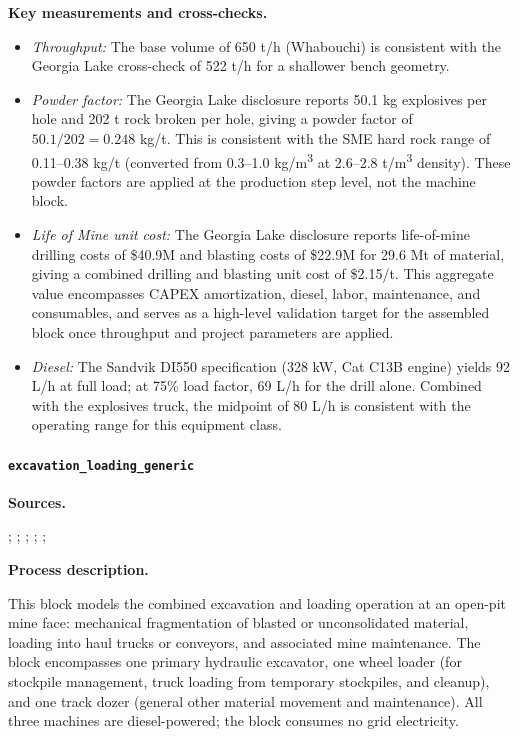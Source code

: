 \medskip
\noindent\textbf{Key measurements and cross-checks.}\quad

\begin{itemize}[noitemsep]
	\item \textit{Throughput:} The base volume of 650 t/h (Whabouchi) is consistent with the Georgia Lake cross-check of 522 t/h for a shallower bench geometry.
	\item \textit{Powder factor:} The Georgia Lake disclosure reports 50.1 kg explosives per hole and 202 t rock broken per hole, giving a powder factor of $50.1/202 = 0.248$ kg/t. This is consistent with the SME hard rock range of 0.11--0.38 kg/t (converted from 0.3--1.0 \si{kg/m^3} at 2.6--2.8 \si{t/m^3} density). These powder factors are applied at the production step level, not the machine block.
	\item \textit{Life of Mine unit cost:} The Georgia Lake disclosure reports life-of-mine drilling costs of \$40.9M and blasting costs of \$22.9M for 29.6 Mt of material, giving a combined drilling and blasting unit cost of \$2.15/t. This aggregate value encompasses CAPEX amortization, diesel, labor, maintenance, and consumables, and serves as a high-level validation target for the assembled block once throughput and project parameters are applied.
	\item \textit{Diesel:} The Sandvik DI550 specification (328 kW, Cat C13B engine) yields 92 L/h at full load; at 75\% load factor, 69 L/h for the drill alone. Combined with the explosives truck, the midpoint of 80 L/h is consistent with the operating range for this equipment class.
\end{itemize}

\clearpage
\paragraph{\texttt{excavation\_loading\_generic}}\label{app:04-methods-blockdefs-excavload}

\medskip
\noindent\textbf{Sources.}\quad

\citet{CatPerformanceHandbookfromVSTfuelconsumption20221209T212009}; \citet{warrenGeorgiaLakeLithium2022}; \citet{mccrackenNI43101Technical2023}; \citet{miningplusptyltd.SECTechnicalReport2023plus}; \citet{petersPlantDesignEconomics1991}; \citet{ulrichGuideChemicalEngineering1984}

\medskip
\noindent\textbf{Process description.}\quad

This block models the combined excavation and loading operation at an open-pit mine face: mechanical fragmentation of blasted or unconsolidated material, loading into haul trucks or conveyors, and associated mine maintenance. The block encompasses one primary hydraulic excavator, one wheel loader (for stockpile management, truck loading from temporary stockpiles, and cleanup), and one track dozer (general other material movement and maintenance). All three machines are diesel-powered; the block consumes no grid electricity.

